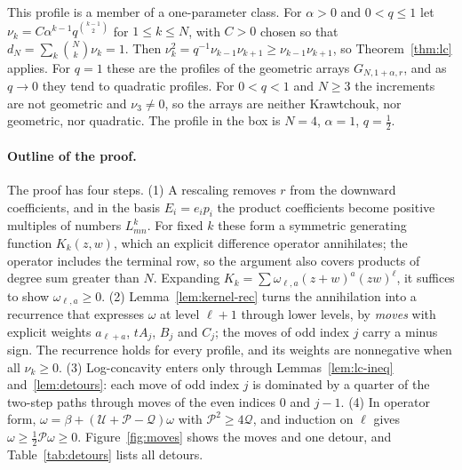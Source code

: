 This profile is a member of a one-parameter class. For $\alpha>0$ and $0<q\leq1$ let $\nu_k=C\alpha^{k-1}q^{\binom{k-1}2}$ for $1\leq k\leq N$, with $C>0$ chosen so that $d_N=\sum_k\binom Nk\nu_k=1$. Then $\nu_k^2=q^{-1}\nu_{k-1}\nu_{k+1}\geq\nu_{k-1}\nu_{k+1}$, so Theorem~\ref{thm:lc} applies. For $q=1$ these are the profiles of the geometric arrays $G_{N,1+\alpha,r}$, and as $q\to0$ they tend to quadratic profiles. For $0<q<1$ and $N\geq3$ the increments are not geometric and $\nu_3\neq0$, so the arrays are neither Krawtchouk, nor geometric, nor quadratic. The profile in the box is $N=4$, $\alpha=1$, $q=\frac12$.

\paragraph{Outline of the proof.}
The proof has four steps. (1) A rescaling removes $r$ from the downward coefficients, and in the basis $E_i=e_ip_i$ the product coefficients become positive multiples of numbers $L_{mn}^k$. For fixed $k$ these form a symmetric generating function $K_k(z,w)$, which an explicit difference operator annihilates; the operator includes the terminal row, so the argument also covers products of degree sum greater than $N$. Expanding $K_k=\sum\omega_{\ell,a}(z+w)^a(zw)^\ell$, it suffices to show $\omega_{\ell,a}\geq0$. (2) Lemma~\ref{lem:kernel-rec} turns the annihilation into a recurrence that expresses $\omega$ at level $\ell+1$ through lower levels, by \emph{moves} with explicit weights $a_{\ell+a}$, $tA_j$, $B_j$ and $C_j$; the moves of odd index $j$ carry a minus sign. The recurrence holds for every profile, and its weights are nonnegative when all $\nu_k\geq0$. (3) Log-concavity enters only through Lemmas~\ref{lem:lc-ineq} and~\ref{lem:detours}: each move of odd index $j$ is dominated by a quarter of the two-step paths through moves of the even indices $0$ and $j-1$. (4) In operator form, $\omega=\beta+(\mathcal U+\mathcal P-\mathcal Q)\omega$ with $\mathcal P^2\geq4\mathcal Q$, and induction on $\ell$ gives $\omega\geq\frac12\mathcal P\omega\geq0$. Figure~\ref{fig:moves} shows the moves and one detour, and Table~\ref{tab:detours} lists all detours.

